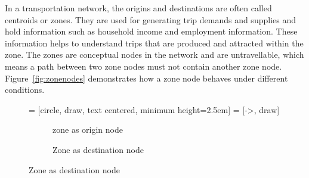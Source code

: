 In a transportation network,
the origins and destinations are often called centroids or zones.
They are used for generating trip demands and supplies
and hold information such as household income and employment information.
These information helps to understand trips that are produced and attracted within the zone.
The zones are conceptual nodes in the network and are untravellable,
which means a path between two zone nodes must not contain another zone node.
Figure~\ref{fig:zonenodes} demonstrates how a zone node behaves under different conditions.

\begin{figure}[H]
     = [circle, draw, text centered, minimum height=2.5em]
     = [->, draw]
    \centering
    \begin{subfigure}[b]{0.4\textwidth}
        \centering
        \caption{zone as origin node}
    \end{subfigure}
    \quad
    \begin{subfigure}[b]{0.4\textwidth}
        \centering
        \caption{Zone as destination node}
    \end{subfigure}


\end{figure}
